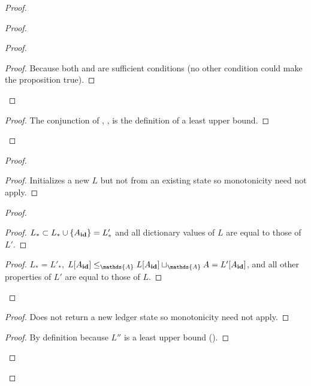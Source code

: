 \documentclass[9pt, oneside]{article}   	%
\begin{document}
\begin{proof}
\begin{proof}
\begin{proof}
			\qedstep
			\begin{proof}
				Because both  and  are sufficient conditions (no other condition could make the proposition true). 
			\end{proof}
		\end{proof}
		
	
		\qedstep
		\begin{proof}
			The conjunction of , ,  is the definition of a least upper bound.
		\end{proof}
	\end{proof}

	\begin{proof}
		\begin{proof}
			Initializes a new $L$ but not from an existing state so monotonicity need not apply.
		\end{proof}
		
		\begin{proof}
			\begin{proof}
				$L_* \subset L_* \cup \{ A_{\scriptsize \textbf{id}} \} = L'_*$ and all dictionary values of $L$ are equal to those of $L'$.
			\end{proof}
			
			\begin{proof}
				$L_* = L'_*$, $L[A_{\scriptsize \textbf{id}}] \leq_\mathds{A} L[A_{\scriptsize \textbf{id}}] \sqcup_\mathds{A} A =  L'[A_{\scriptsize \textbf{id}}]$, and all other properties of $L'$ are equal to those of $L$.
			\end{proof}
		\end{proof}
			
		\begin{proof}
			Does not return a new ledger state so monotonicity need not apply.
		\end{proof}
			
		\begin{proof}
		 	By definition because $L''$ is a least upper bound ().
		\end{proof}
			

\end{proof}
\end{proof}
\end{document}

